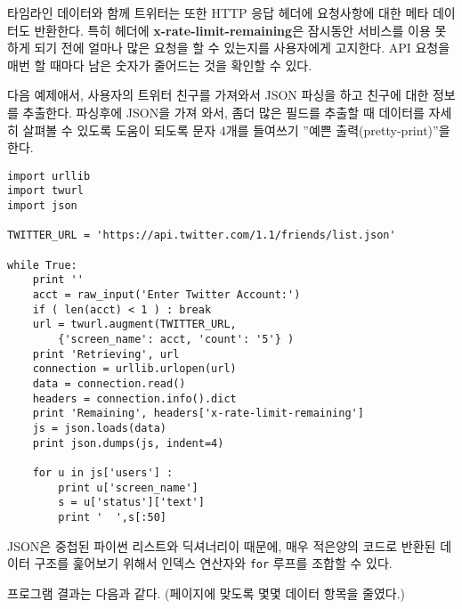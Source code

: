 타임라인 데이터와 함께 트위터는 또한 HTTP 응답 헤더에 요청사항에 대한 메타 데이터도 반환한다.
특히 헤더에  {\bf x-rate-limit-remaining}은 잠시동안 서비스를 이용 못하게 되기 전에 얼마나 많은 요청을 할 수 있는지를 사용자에게 고지한다. API 요청을 매번 할 때마다 남은 숫자가 줄어드는 것을 확인할 수 있다.

다음 예제애서, 사용자의 트위터 친구를 가져와서 JSON 파싱을 하고 친구에 대한 정보를 추출한다.
파싱후에 JSON을 가져 와서, 좀더 많은 필드를 추출할 때 데이터를 자세히 살펴볼 수 있도록 도움이 되도록 문자 4개를 들여쓰기 ''예쁜 출력(pretty-print)''을 한다.

\beforeverb
\begin{verbatim}
import urllib
import twurl
import json

TWITTER_URL = 'https://api.twitter.com/1.1/friends/list.json'

while True:
    print ''
    acct = raw_input('Enter Twitter Account:')
    if ( len(acct) < 1 ) : break
    url = twurl.augment(TWITTER_URL,
        {'screen_name': acct, 'count': '5'} )
    print 'Retrieving', url
    connection = urllib.urlopen(url)
    data = connection.read()
    headers = connection.info().dict
    print 'Remaining', headers['x-rate-limit-remaining']
    js = json.loads(data)
    print json.dumps(js, indent=4)

    for u in js['users'] :
        print u['screen_name']
        s = u['status']['text']
        print '  ',s[:50]
\end{verbatim}
\afterverb
%
JSON은 중첩된 파이썬 리스트와 딕셔너리이 때문에, 매우 적은양의 코드로 반환된 데이터 구조를 훑어보기 위해서 
인덱스 연산자와 {\tt for} 루프를 조합할 수 있다.

프로그램 결과는 다음과 같다. (페이지에 맞도록 몇몇 데이터 항목을 줄였다.)

